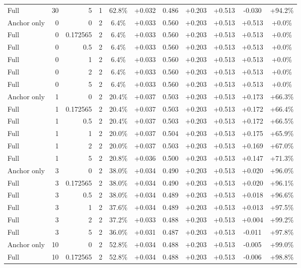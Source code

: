 \begin{table}[htbp]
\begin{tabular}{lrrrccccccc}
Full & 30 & 5 & 1 & 62.8\% & +0.032 & 0.486 & +0.203 & +0.513 & -0.030 & +94.2\% \\
Anchor only & 0 & 0 & 2 & 6.4\% & +0.033 & 0.560 & +0.203 & +0.513 & +0.513 & +0.0\% \\
Full & 0 & 0.172565 & 2 & 6.4\% & +0.033 & 0.560 & +0.203 & +0.513 & +0.513 & +0.0\% \\
Full & 0 & 0.5 & 2 & 6.4\% & +0.033 & 0.560 & +0.203 & +0.513 & +0.513 & +0.0\% \\
Full & 0 & 1 & 2 & 6.4\% & +0.033 & 0.560 & +0.203 & +0.513 & +0.513 & +0.0\% \\
Full & 0 & 2 & 2 & 6.4\% & +0.033 & 0.560 & +0.203 & +0.513 & +0.513 & +0.0\% \\
Full & 0 & 5 & 2 & 6.4\% & +0.033 & 0.560 & +0.203 & +0.513 & +0.513 & +0.0\% \\
Anchor only & 1 & 0 & 2 & 20.4\% & +0.037 & 0.503 & +0.203 & +0.513 & +0.173 & +66.3\% \\
Full & 1 & 0.172565 & 2 & 20.4\% & +0.037 & 0.503 & +0.203 & +0.513 & +0.172 & +66.4\% \\
Full & 1 & 0.5 & 2 & 20.4\% & +0.037 & 0.503 & +0.203 & +0.513 & +0.172 & +66.5\% \\
Full & 1 & 1 & 2 & 20.0\% & +0.037 & 0.504 & +0.203 & +0.513 & +0.175 & +65.9\% \\
Full & 1 & 2 & 2 & 20.0\% & +0.037 & 0.503 & +0.203 & +0.513 & +0.169 & +67.0\% \\
Full & 1 & 5 & 2 & 20.8\% & +0.036 & 0.500 & +0.203 & +0.513 & +0.147 & +71.3\% \\
Anchor only & 3 & 0 & 2 & 38.0\% & +0.034 & 0.490 & +0.203 & +0.513 & +0.020 & +96.0\% \\
Full & 3 & 0.172565 & 2 & 38.0\% & +0.034 & 0.490 & +0.203 & +0.513 & +0.020 & +96.1\% \\
Full & 3 & 0.5 & 2 & 38.0\% & +0.034 & 0.489 & +0.203 & +0.513 & +0.018 & +96.6\% \\
Full & 3 & 1 & 2 & 37.6\% & +0.034 & 0.489 & +0.203 & +0.513 & +0.013 & +97.5\% \\
Full & 3 & 2 & 2 & 37.2\% & +0.033 & 0.488 & +0.203 & +0.513 & +0.004 & +99.2\% \\
Full & 3 & 5 & 2 & 36.0\% & +0.031 & 0.487 & +0.203 & +0.513 & -0.011 & +97.8\% \\
Anchor only & 10 & 0 & 2 & 52.8\% & +0.034 & 0.488 & +0.203 & +0.513 & -0.005 & +99.0\% \\
Full & 10 & 0.172565 & 2 & 52.8\% & +0.034 & 0.488 & +0.203 & +0.513 & -0.006 & +98.8\% \\

\end{tabular}
\end{table}
